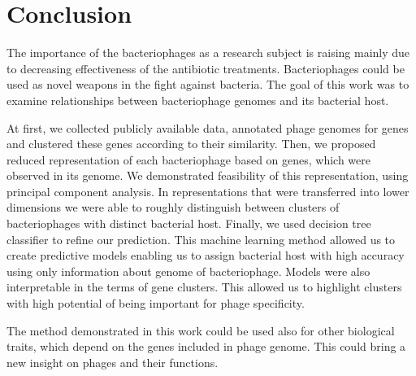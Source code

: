 \chapter*{Conclusion} %

The importance of the bacteriophages as a research subject is raising mainly due to decreasing effectiveness of the antibiotic treatments.
Bacteriophages could be used as novel weapons in the fight against bacteria.
The goal of this work was to examine relationships between bacteriophage genomes and its bacterial host.


At first, we collected publicly available data, annotated phage genomes for genes and clustered these genes according to their similarity.
Then, we proposed reduced representation of each bacteriophage based on genes, which were observed in its genome.
We demonstrated feasibility of this representation, using principal component analysis. 
In representations that were transferred into lower dimensions we were able to roughly distinguish between clusters of bacteriophages with distinct bacterial host.
Finally, we used decision tree classifier to refine our prediction.
This machine learning method allowed us to create predictive models enabling us to assign bacterial host with high accuracy using only information about genome of bacteriophage.
Models were also interpretable in the terms of gene clusters.
This allowed us to highlight clusters with high potential of being important for phage specificity. 

The method demonstrated in this work could be used also for other biological traits, which depend on the genes included in phage genome.
This could bring a new insight on phages and their functions.


